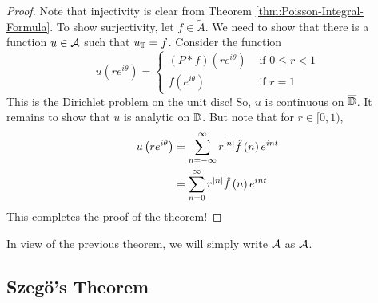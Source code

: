 \begin{proof}
    Note that injectivity is clear from Theorem \ref{thm:Poisson-Integral-Formula}. To show surjectivity, let $f\in \tilde{A}$. We need to show that there is a function $u \in {\cal A}$ such that $u_{\mathbb T} = f$. Consider the function
    \begin{equation*}
	u\left( re^{i\theta} \right) =
	\begin{cases}
	    (P*f) (re^{i\theta}) & \text{ if } 0\le r <1 \\ 
	    f\left( e^{i\theta} \right) & \text{ if } r=1
	\end{cases}
    \end{equation*}
    This is the Dirichlet problem on the unit disc! So, $u$ is continuous on $\overline {\mathbb D}$. It remains to show that $u$ is analytic on $\mathbb D$. But note that for $r\in [0,1)$,
    \begin{align*}
    u\left( re^{i\theta} \right) &= \sum_{n=-\infty}^{\infty} r^{\left\lvert n \right\rvert} \hat{f}\left( n \right) e^{int} \\
&= \sum_{n=0}^{\infty} r^{\left\lvert n \right\rvert} \hat{f}\left( n \right) e^{int} 
    \end{align*}
    This completes the proof of the theorem!
\end{proof}

In view of the previous theorem, we will simply write $\tilde{{\cal A}}$ as ${\cal A}$.


\horz 

\begin{theorem}
    
    \label{thm:f-m-riesz}
\end{theorem}

\subsection{Szegö's Theorem}
